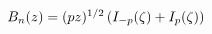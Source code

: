 $\mathop{B_{n}\/}\nolimits\!\left(z\right)=(pz)^{1/2}\left(\mathop{I_{-p}\/}%
\nolimits\!\left(\zeta\right)+\mathop{I_{p}\/}\nolimits\!\left(\zeta\right)\right)$